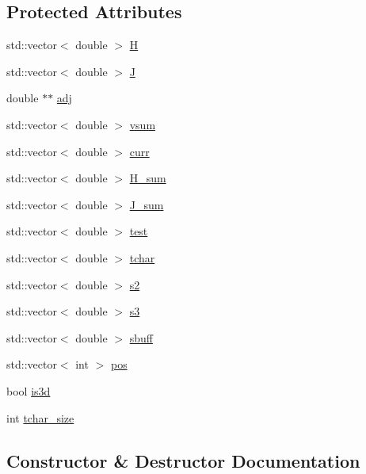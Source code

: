 \subsection*{Protected Attributes}
\begin{DoxyCompactItemize}
\item 
std\+::vector$<$ double $>$ \hyperlink{classham__heis_af22659980108a924b51aa3b02bfce7ef}{H}
\item 
std\+::vector$<$ double $>$ \hyperlink{classham__heis_aa1cd68f7e9c6e98dd2dc9106cbb68603}{J}
\item 
double $\ast$$\ast$ \hyperlink{classham__heis_af643b0778b6c203578db1261ca3a6fd3}{adj}
\item 
std\+::vector$<$ double $>$ \hyperlink{classham__heis_ad7034ab0ac64b9c44f9975551acfc8ab}{vsum}
\item 
std\+::vector$<$ double $>$ \hyperlink{classham__heis_acbabe37ab60e2ec457106cfa49d2e1db}{curr}
\item 
std\+::vector$<$ double $>$ \hyperlink{classham__heis_a7c66e06dccb2686c392f5e9ddd8f6463}{H\+\_\+sum}
\item 
std\+::vector$<$ double $>$ \hyperlink{classham__heis_ad19fe40a32695f0f7fefb229648680b4}{J\+\_\+sum}
\item 
std\+::vector$<$ double $>$ \hyperlink{classham__heis_a5537fc1b0944509d2911fd35b4674c67}{test}
\item 
std\+::vector$<$ double $>$ \hyperlink{classham__heis_a934a89b1b1ba1a0451eced2b7398139d}{tchar}
\item 
std\+::vector$<$ double $>$ \hyperlink{classham__heis_a4b358a692afffe59e6ff0ae5255ccf30}{s2}
\item 
std\+::vector$<$ double $>$ \hyperlink{classham__heis_a50580c61051da5c6bad049c093f73a7c}{s3}
\item 
std\+::vector$<$ double $>$ \hyperlink{classham__heis_a7a09caf68e6a72d2a157e97ad23bd595}{sbuff}
\item 
std\+::vector$<$ int $>$ \hyperlink{classham__heis_afd230eba6b611edbc97677ca58b29f51}{pos}
\item 
bool \hyperlink{classham__heis_a4c756eded6f6d3e307402c02e07f82c6}{is3d}
\item 
int \hyperlink{classham__heis_a35d572f45863870d8581a83821b890ae}{tchar\+\_\+size}
\end{DoxyCompactItemize}


\subsection{Constructor \& Destructor Documentation}
